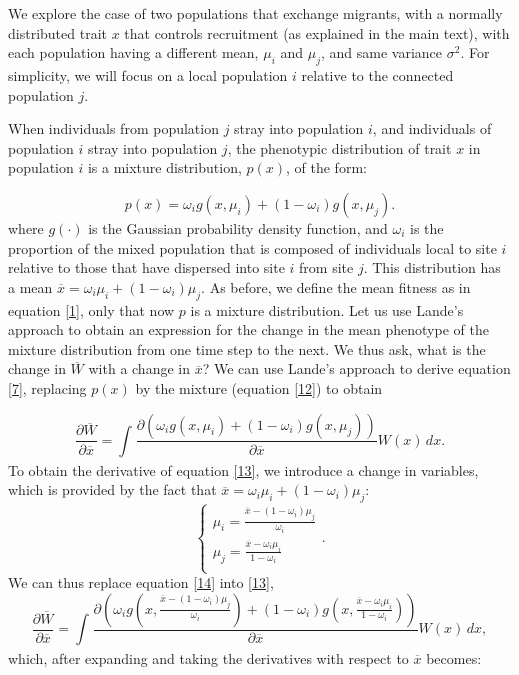 \documentclass{revtex4}
\begin{document}
We explore the case of two populations that exchange migrants, with a normally distributed trait $x$ that controls recruitment (as explained in the main text), with each population having a different mean, $\mu_{i}$ and $\mu_{j}$, and same variance $\sigma^{2}$. For simplicity, we will focus on a local population $i$ relative to the connected population $j$.

When individuals from population $j$ stray into population $i$, and individuals of population $i$ stray into population $j$, the phenotypic distribution of trait $x$ in population $i$ is a mixture distribution, $p(x)$, of the form:

\begin{equation}\label{12}
p(x)=\omega_i g(x,\mu_{i})+(1-\omega_i)g(x,\mu_{j}).
\end{equation}
where $g(\cdot)$ is the Gaussian probability density function, and $\omega_i$ is the proportion of the mixed population that is composed of individuals local to site $i$ relative to those that have dispersed into site $i$ from site $j$.
This distribution has a mean $\overline{x}=\omega_i \mu_{i}+(1-\omega_i)\mu_{j}$. As before, we define the mean fitness as in equation \ref{1}, only that now $p$ is a mixture distribution. Let us use Lande's approach to obtain an expression for the change in the mean phenotype of the mixture distribution from one time step to the next. We thus ask, what is the change in $\overline{W}$ with a change in $\overline{x}$? We can use Lande's approach \cite{Lande:1976ga} to derive equation \ref{7}, replacing $p(x)$ by the mixture (equation \ref{12}) to obtain 

\begin{equation}\label{13}
\frac{\partial \overline{W}}{\partial \overline{x}}=\int_{} \frac{\partial (\omega_i g(x,\mu_{i})+(1-\omega_i)g(x,\mu_{j}))}{\partial \overline{x}}W(x)\,dx.
\end{equation}
To obtain the derivative of equation \ref{13}, we introduce a change in variables, which is provided by the fact that $\overline{x}=\omega_i \mu_{i}+(1-\omega_i)\mu_{j}$:
\begin{equation} \label{14}
	\begin{cases} 
		\mu_{i}=\frac{\overline{x}-(1-\omega_i)\mu_{j}}{\omega_i}\\
		\mu_{j}=\frac{\overline{x}-\omega_i\mu_{i}}{1-\omega_i}\\
	\end{cases}.
\end{equation}
We can thus replace equation \ref{14} into \ref{13},
\begin{equation}\label{15}
\frac{\partial \overline{W}}{\partial \overline{x}}=\int_{} \frac{\partial (\omega_i g(x,\frac{\overline{x}-(1-\omega_i)\mu_{j}}{\omega_i})+(1-\omega_i)g(x,\frac{\overline{x}-\omega_i\mu_{i}}{1-\omega_i}))}{\partial \overline{x}}W(x)\,dx,
\end{equation} 
which, after expanding and taking the derivatives with respect to $\overline{x}$ becomes:
\end{document}
